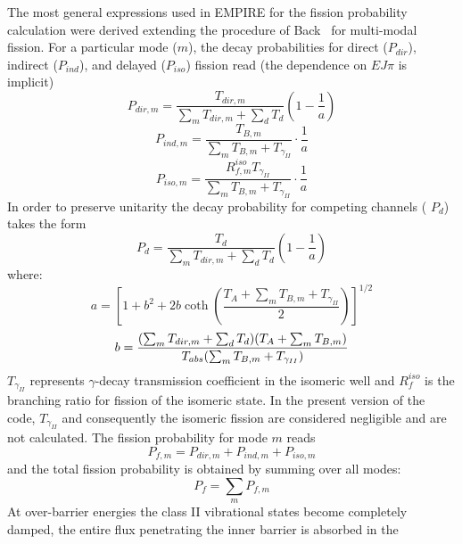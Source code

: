 The most general expressions used in EMPIRE for the fission probability
calculation were derived extending the procedure of Back~\cite{Back:74} for
multi-modal fission. For a particular mode ($m$), the decay probabilities
for direct ($P_{dir}$), indirect ($P_{ind}$), and delayed ($P_{iso}$)
fission read (the dependence on $EJ\pi$ is implicit)
\begin{equation}
P_{dir,m}=\frac{T_{dir,m}}{\sum_{m}T_{dir,m}+\sum_{d}T_{d}}\left(1-\frac{1}{a%
}\right)
\end{equation}
\begin{equation}
P_{ind,m}=\frac{T_{B,m}}{\sum_{m}T_{B,m}+T_{\gamma_{II}}}\cdot\frac{1}{a}
\end{equation}
\begin{equation}
P_{iso,m}=\frac{R_{f,m}^{iso}T_{\gamma_{II}}}{\sum_{m}T_{B,m}+T_{\gamma_{II}}%
}\cdot\frac{1}{a}
\end{equation}
In order to preserve unitarity the decay probability for competing channels (%
$P_{d}$) takes the form
\begin{equation}
P_{d}=\frac{T_{d}}{\sum_{m}T_{dir,m}+\sum_{d}T_{d}}\left(1-\frac{1}{a}\right)
\end{equation}
\noindent where:
\begin{equation*}
a=\left[1+b^{2}+2b\coth\left(\frac{T_{A}+\sum_{m}T_{B,m}+T_{\gamma_{II}}}{2}%
\right)\right]^{1/2}
\end{equation*}
\begin{equation*}
b=\frac{(\sum_{m}T_{dir,m}+\sum_{d}T_{d})(T_{A}+\sum_{m}T_{B,m})}{%
T_{abs}(\sum_{m}T_{B,m}+T_{\gamma_{II}})}
\end{equation*}
$T_{\gamma_{II}}$ represents $\gamma$-decay transmission coefficient in the
isomeric well and $R_{f}^{iso}$ is the branching ratio for fission of the
isomeric state. In the present version of the code, $T_{\gamma_{II}}$ and
consequently the isomeric%
 fission are considered negligible and are not
calculated. The fission probability for mode $m$ reads
\begin{equation}
P_{f,m}=P_{dir,m}+P_{ind,m}+P_{iso,m}
\end{equation}
and the total fission probability is obtained by summing over all modes:
\begin{equation}
P_{f}=\sum_{m}P_{f,m}
\end{equation}
At over-barrier energies the class II vibrational states become completely
damped, the entire flux penetrating the inner barrier is absorbed in the
